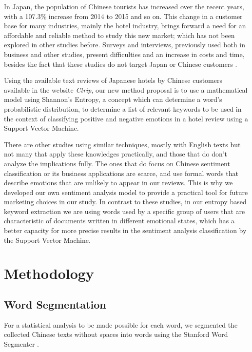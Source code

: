 \documentclass[review]{elsarticle}
\begin{document}
In Japan, the population of Chinese tourists has increased over the recent years, with a 107.3\% increase from 2014 to 2015 \cite[][]{jnto2017} and so on. This change in a customer base for many industries, mainly the hotel industry, brings forward a need for an affordable and reliable method to study this new market; which has not been explored in other studies before. Surveys and interviews, previously used both in business and other studies, present difficulties and an increase in costs and time, besides the fact that these studies \cite[][]{chang2010, truong2009} do not target Japan or Chinese customers \cite[][]{ma2008}.

Using the available text reviews of Japanese hotels by Chinese customers available in the website \textit{Ctrip}, our new method proposal is to use a mathematical model using Shannon's Entropy, a concept which can determine a word's probabilistic distribution, to determine a list of relevant keywords to be used in the context of classifying positive and negative emotions in a hotel review using a Support Vector Machine.

There are other studies using similar techniques, mostly with English texts \cite[][]{bollen2011, oconnor2010} but not many that apply these knowledges practically, and those that do \cite[][]{he2013} don't analyze the implications fully. The ones that do focus on Chinese sentiment classification \cite[][]{lee2010-a} or its business applications \cite[][]{zhang2011} are scarce, and use formal words that describe emotions that are unlikely to appear in our reviews. This is why we developed our own sentiment analysis model to provide a practical tool for future marketing choices in our study. In contrast to these studies, in our entropy based keyword extraction we are using words used by a specific group of users that are characteristic of documents written in different emotional states, which has a better capacity for more precise results in the sentiment analysis classification by the Support Vector Machine.

\section{Methodology}\label{methodology}

\subsection{Word Segmentation}\label{segmentation}

For a statistical analysis to be made possible for each word, we segmented the collected Chinese texts without spaces into words using the Stanford Word Segmenter \cite[][]{chang2008}.
\end{document}
